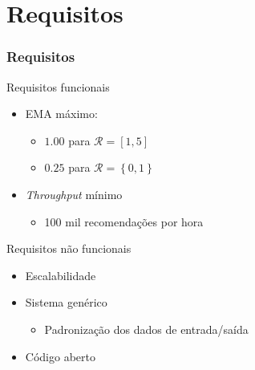 \section[Requisitos]{Requisitos}
\begin{frame}
\frametitle{Requisitos}
\begin{block}{Requisitos funcionais}
\begin{itemize}
	\item EMA máximo: 
	\begin{itemize}
		\item $1.00$ para $\mathcal{R} = \left[1,5\right]$
		\item $0.25$ para $\mathcal{R} = \left\{0,1\right\}$
	\end{itemize}
	\item \textit{Throughput} mínimo
	\begin{itemize}
		\item 100 mil recomendações por hora
	\end{itemize}
\end{itemize}
\end{block}

\begin{block}{Requisitos não funcionais}
\begin{itemize}
	\item Escalabilidade
	\item Sistema genérico
	\begin{itemize}
		\item Padronização dos dados de entrada/saída
	\end{itemize}
	\item Código aberto
\end{itemize}
\end{block}
\end{frame}
